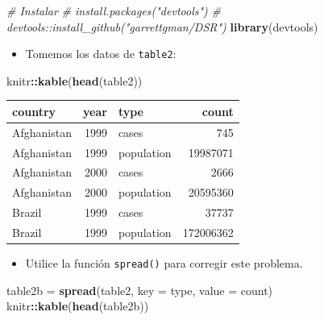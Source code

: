 \documentclass[
]{book}
\newenvironment{Shaded}{\begin{snugshade}}{\end{snugshade}}
\newcommand{\AttributeTok}[1]{\textcolor[rgb]{0.13,0.29,0.53}{#1}}
\newcommand{\CommentTok}[1]{\textcolor[rgb]{0.56,0.35,0.01}{\textit{#1}}}
\newcommand{\FunctionTok}[1]{\textcolor[rgb]{0.13,0.29,0.53}{\textbf{#1}}}
\newcommand{\NormalTok}[1]{#1}
\newcommand{\OtherTok}[1]{\textcolor[rgb]{0.56,0.35,0.01}{#1}}
\newcommand{\SpecialCharTok}[1]{\textcolor[rgb]{0.81,0.36,0.00}{\textbf{#1}}}
\providecommand{\tightlist}{%
  \setlength{\itemsep}{0pt}\setlength{\parskip}{0pt}}
\begin{document}
\begin{Shaded}
\begin{Highlighting}[]
\CommentTok{\# Instalar }
\CommentTok{\# install.packages("devtools")}
\CommentTok{\# devtools::install\_github("garrettgman/DSR")}
\FunctionTok{library}\NormalTok{(devtools)}
\end{Highlighting}
\end{Shaded}

\begin{itemize}
\tightlist
\item
  Tomemos los datos de \texttt{table2}:
\end{itemize}

\begin{Shaded}
\begin{Highlighting}[]
\NormalTok{knitr}\SpecialCharTok{::}\FunctionTok{kable}\NormalTok{(}\FunctionTok{head}\NormalTok{(table2))}
\end{Highlighting}
\end{Shaded}

\begin{tabular}{l|r|l|r}
\hline
country & year & type & count\\
\hline
Afghanistan & 1999 & cases & 745\\
\hline
Afghanistan & 1999 & population & 19987071\\
\hline
Afghanistan & 2000 & cases & 2666\\
\hline
Afghanistan & 2000 & population & 20595360\\
\hline
Brazil & 1999 & cases & 37737\\
\hline
Brazil & 1999 & population & 172006362\\
\hline
\end{tabular}

\begin{itemize}
\tightlist
\item
  Utilice la función \texttt{spread()} para corregir este problema.
\end{itemize}

\begin{Shaded}
\begin{Highlighting}[]
\NormalTok{table2b }\OtherTok{=} \FunctionTok{spread}\NormalTok{(table2, }\AttributeTok{key =}\NormalTok{ type, }\AttributeTok{value =}\NormalTok{ count)}
\NormalTok{knitr}\SpecialCharTok{::}\FunctionTok{kable}\NormalTok{(}\FunctionTok{head}\NormalTok{(table2b))}
\end{Highlighting}
\end{Shaded}
\end{document}
